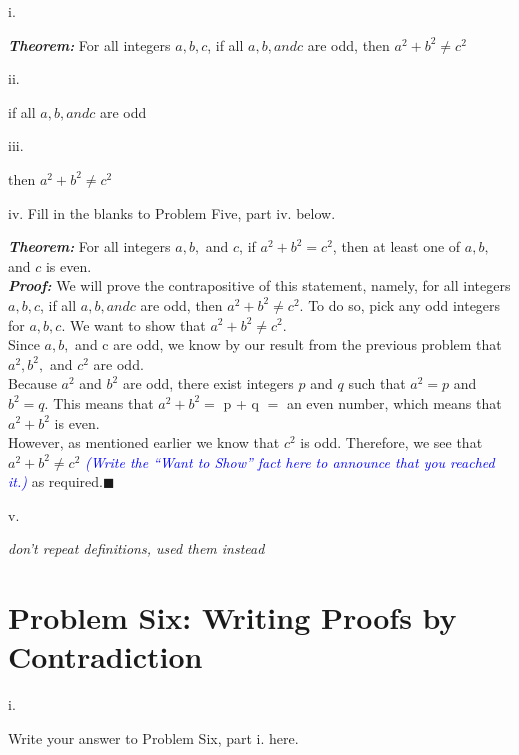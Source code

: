\documentclass{article}
\renewcommand{\(}{\left(}
\renewcommand{\)}{\right)}
\renewcommand\qedsymbol{$\blacksquare$}
\renewcommand{\emph}[1]{\textit{\textbf{#1}}}
\newcommand{\annotate}[1]{\textit{\textcolor{blue}{#1}}}
\theoremstyle{plain}
\theoremstyle{plain}
\theoremstyle{definition}
\begin{document}
i.
\begin{shaded}
\textbf\textit{Theorem:} For all integers $a, b, c$, if all $a, b, and c$ are odd,
then $a^2 + b^2 \ne c^2$
\end{shaded}

ii.
\begin{shaded}
if all $a, b, and c$ are odd
\end{shaded}

iii.
\begin{shaded}
then $a^2 + b^2 \ne c^2$
\end{shaded}

iv. Fill in the blanks to Problem Five, part iv. below.
\begin{center}
\begin{boxedminipage}{0.9\textwidth}
\emph{Theorem:} For all integers $a, b, $ and $c$, if $a^{2} + b^{2} = c^{2}$, then at least one of $a, b, $ and $c$ is even. \\
\emph{Proof: } We will prove the contrapositive of this statement, namely, for all integers $a, b, c$, if all $a, b, and c$ are odd,
then $a^2 + b^2 \ne c^2$.  To do so, pick any odd integers for $a, b, c$. We want to show that $a^2 + b^2 \ne c^2$. \\
Since $a, b, $ and c are odd, we know by our result from the previous problem that $a^{2}, b^{2}, $ and $c^{2}$ are odd.\\
Because $a^{2}$ and $b^{2}$ are odd, there exist integers $p$ and $q$ such that $a^2 = p$ and $b^2 = q$. This means that
$a^{2} + b^{2} = $ p + q $=$ an even number, which means that $a^{2} + b^{2}$ is even.\\
However, as mentioned earlier we know that $c^{2}$ is odd. Therefore, we see that $a^2 + b^2 \ne c^2$ \annotate{(Write the ``Want to Show'' fact here to announce that you reached it.)} as required.\qedsymbol
\end{boxedminipage}
\end{center}

v.
\begin{shaded}

\textit{don't repeat definitions, used them instead}
\end{shaded}

\newpage
\section*{Problem Six: Writing Proofs by Contradiction}

i.
\begin{shaded}
Write your answer to Problem Six, part i. here.
\end{shaded}
\end{document}
